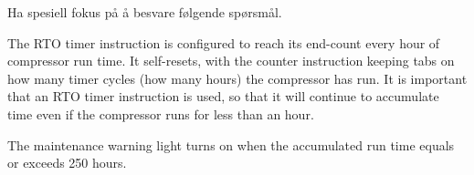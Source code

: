 Ha spesiell fokus på å besvare følgende spørsmål. 







The RTO timer instruction is configured to reach its end-count every hour of compressor run time.  It self-resets, with the counter instruction keeping tabs on how many timer cycles (how many hours) the compressor has run.  It is important that an RTO timer instruction is used, so that it will continue to accumulate time even if the compressor runs for less than an hour.

\vskip 10pt

The maintenance warning light turns on when the accumulated run time equals or exceeds 250 hours.




